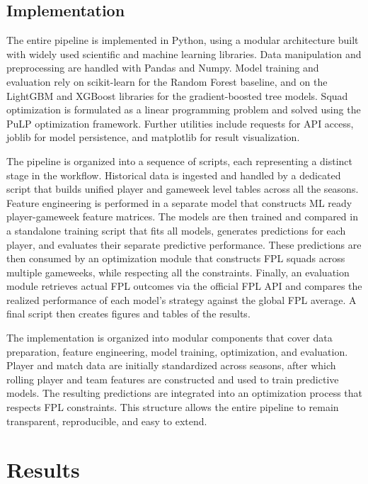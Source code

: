\documentclass[11pt,a4paper]{article}
\begin{document}
\subsection{Implementation}
The entire pipeline is implemented in Python, using a modular architecture built with widely used scientific and machine learning libraries. Data manipulation and preprocessing are handled with Pandas and Numpy. Model training and evaluation rely on scikit-learn for the Random Forest baseline, and on the LightGBM and XGBoost libraries for the gradient-boosted tree models. Squad optimization is formulated as a linear programming problem and solved using the PuLP optimization framework. Further utilities include requests for API access, joblib for model persistence, and matplotlib for result visualization.

The pipeline is organized into a sequence of scripts, each representing a distinct stage in the workflow. Historical data is ingested and handled by a dedicated script that builds unified player and gameweek level tables across all the seasons. Feature engineering is performed in a separate model that constructs ML ready player-gameweek feature matrices. The models are then trained and compared in a standalone training script that fits all models, generates predictions for each player, and evaluates their separate predictive performance. These predictions are then consumed by an optimization module that constructs FPL squads across multiple gameweeks, while respecting all the constraints. Finally, an evaluation module retrieves actual FPL outcomes via the official FPL API and compares the realized performance of each model’s strategy against the global FPL average. A final script then creates figures and tables of the results.

The implementation is organized into modular components that cover data preparation, feature engineering, model training, optimization, and evaluation. Player and match data are initially standardized across seasons, after which rolling player and team features are constructed and used to train predictive models. The resulting predictions are integrated into an optimization process that respects FPL constraints. This structure allows the entire pipeline to remain transparent, reproducible, and easy to extend.


\section{Results}
\label{sec:results}
\end{document}
